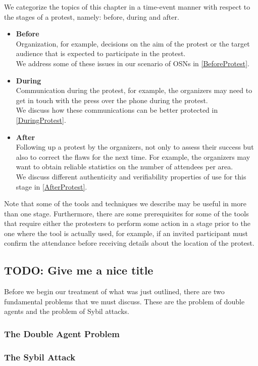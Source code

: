 We categorize the topics of this chapter in a time-event manner with respect to the 
stages of a protest, namely: before, during and after.
\begin{itemize}
    \item \textbf{Before}\\
    Organization, for example, decisions on the aim of the protest or the target audience that 
    is expected to participate in the protest.\\
    We address some of these issues in our scenario of \acp{OSN} in \cref{BeforeProtest}.

    \item \textbf{During}\\
    Communication during the protest, for example, 
    the organizers may need to get in touch with the press over the phone during 
    the protest.\\
    We discuss how these communications can be better protected in \cref{DuringProtest}.

    \item \textbf{After}\\
    Following up a protest by the organizers, not 
    only to assess their success but also to correct the flaws for the next time. 
    For example, the organizers may want to obtain reliable statistics on the number 
    of attendees per area.\\
    We discuss different authenticity and verifiability properties of use for this 
    stage in \cref{AfterProtest}.
\end{itemize}

Note that some of the tools and techniques we describe may be useful in more than 
one stage. Furthermore, there are some prerequisites for some of the tools that 
require either the protesters to perform some action in a stage prior to the one 
where the tool is actually used, for example, if an invited participant must confirm 
the attendance before receiving details about the location of the protest.

\subsection{TODO: Give me a nice title}
Before we begin our treatment of what was just outlined, there are two 
fundamental problems that we must discuss.
These are the problem of double agents and the problem of Sybil attacks.

\subsubsection{The Double Agent Problem}
\label{DoubleAgentProblem}



\subsubsection{The Sybil Attack}
\label{SybilAttacks}



